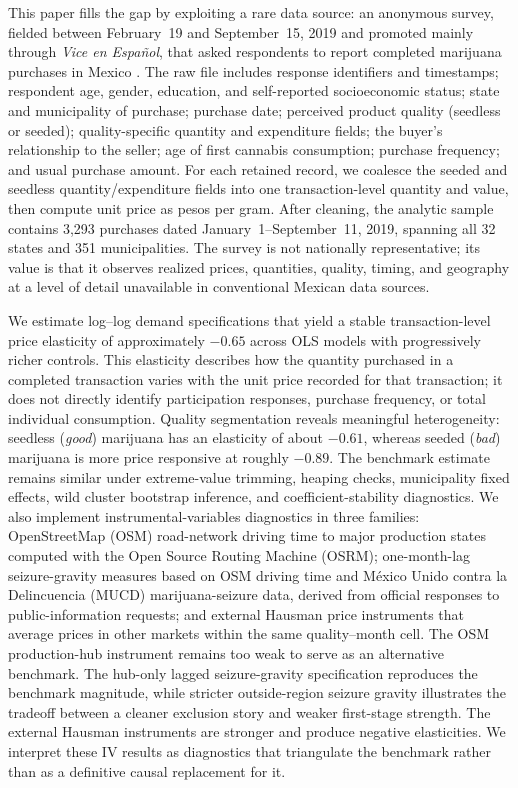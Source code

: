 This paper fills the gap by exploiting a rare data source: an anonymous survey, fielded between February~19 and September~15, 2019 and promoted mainly through \emph{Vice en Espa\~{n}ol}, that asked respondents to report completed marijuana purchases in Mexico \citep{bejaranoromero2020dataset}.  The raw file includes response identifiers and timestamps; respondent age, gender, education, and self-reported socioeconomic status; state and municipality of purchase; purchase date; perceived product quality (seedless or seeded); quality-specific quantity and expenditure fields; the buyer's relationship to the seller; age of first cannabis consumption; purchase frequency; and usual purchase amount.  For each retained record, we coalesce the seeded and seedless quantity/expenditure fields into one transaction-level quantity and value, then compute unit price as pesos per gram.  After cleaning, the analytic sample contains 3{,}293 purchases dated January~1--September~11, 2019, spanning all 32 states and 351 municipalities.  The survey is not nationally representative; its value is that it observes realized prices, quantities, quality, timing, and geography at a level of detail unavailable in conventional Mexican data sources.

We estimate log--log demand specifications that yield a stable transaction-level price elasticity of approximately $-0.65$ across OLS models with progressively richer controls. This elasticity describes how the quantity purchased in a completed transaction varies with the unit price recorded for that transaction; it does not directly identify participation responses, purchase frequency, or total individual consumption.  Quality segmentation reveals meaningful heterogeneity: seedless (\emph{good}) marijuana has an elasticity of about $-0.61$, whereas seeded (\emph{bad}) marijuana is more price responsive at roughly $-0.89$.  The benchmark estimate remains similar under extreme-value trimming, heaping checks, municipality fixed effects, wild cluster bootstrap inference, and coefficient-stability diagnostics.  We also implement instrumental-variables diagnostics in three families: OpenStreetMap (OSM) road-network driving time to major production states computed with the Open Source Routing Machine (OSRM); one-month-lag seizure-gravity measures based on OSM driving time and M\'{e}xico Unido contra la Delincuencia (MUCD) marijuana-seizure data, derived from official responses to public-information requests; and external Hausman price instruments that average prices in other markets within the same quality--month cell.  The OSM production-hub instrument remains too weak to serve as an alternative benchmark.  The hub-only lagged seizure-gravity specification reproduces the benchmark magnitude, while stricter outside-region seizure gravity illustrates the tradeoff between a cleaner exclusion story and weaker first-stage strength.  The external Hausman instruments are stronger and produce negative elasticities.  We interpret these IV results as diagnostics that triangulate the benchmark rather than as a definitive causal replacement for it.

